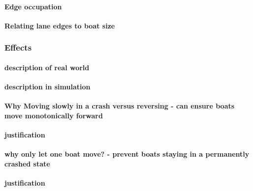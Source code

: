         \paragraph{Edge occupation}
        \paragraph{Relating lane edges to boat size}
      \subsubsection{Effects}
        \paragraph{description of real world}
        \paragraph{description in simulation}
        \paragraph{Why Moving slowly in a crash versus reversing - can ensure boats move monotonically forward}
        \paragraph{justification}
        \paragraph{why only let one boat move? - prevent boats staying in a permanently crashed state}
        \paragraph{justification}
  

